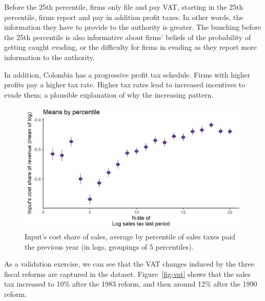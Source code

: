 \documentclass[
  12pt]{article}
\theoremstyle{definition}
\theoremstyle{remark}
\begin{document}
Before the 25th percentile, firms only file and pay VAT, starting in the
25th percentile, firms report and pay in addition profit taxes. In other
words, the information they have to provide to the authority is greater.
The bunching before the 25th percentile is also informative about firms'
beliefs of the probability of getting caught evading, or the difficulty
for firms in evading as they report more information to the authority.

In addition, Colombia has a progressive profit tax schedule. Firms with
higher profits pay a higher tax rate. Higher tax rates lead to increased
incentives to evade them; a plausible explanation of why the increasing
pattern.

\begin{figure}

{\centering \includegraphics[width=1\textwidth,height=\textheight]{../Results/Figures/Colombia/select_disc_lag_log_sales_tax_20.png}

}

\caption{\label{fig-ls-ntax}Input's cost share of sales, average by
percentile of sales taxes paid the previous year (in logs, groupings of
5 percentiles).}

\end{figure}

As a validation exercise, we can see that the VAT changes induced by the
three fiscal reforms are captured in the dataset. Figure~\ref{fig-vat}
shows that the sales tax increased to 10\% after the 1983 reform, and
then around 12\% after the 1990 reform.
\end{document}
